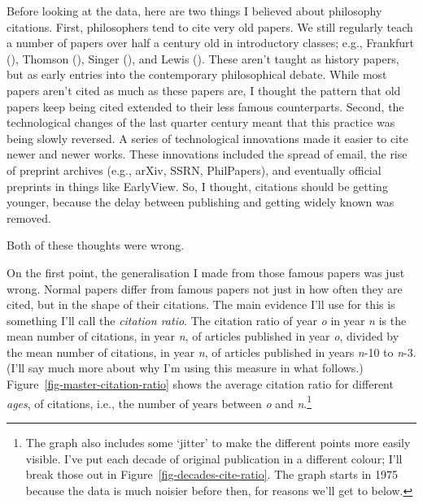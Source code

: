 \documentclass[
  12pt,
  letterpaper,
  DIV=11,
  numbers=noendperiod]{scrartcl}
\begin{document}
Before looking at the data, here are two things I believed about
philosophy citations. First, philosophers tend to cite very old papers.
We still regularly teach a number of papers over half a century old in
introductory classes; e.g., Frankfurt
(), Thomson
(), Singer
(), and Lewis
(). These aren't taught as history
papers, but as early entries into the contemporary philosophical debate.
While most papers aren't cited as much as these papers are, I thought
the pattern that old papers keep being cited extended to their less
famous counterparts. Second, the technological changes of the last
quarter century meant that this practice was being slowly reversed. A
series of technological innovations made it easier to cite newer and
newer works. These innovations included the spread of email, the rise of
preprint archives (e.g., arXiv, SSRN, PhilPapers), and eventually
official preprints in things like EarlyView. So, I thought, citations
should be getting younger, because the delay between publishing and
getting widely known was removed.

Both of these thoughts were wrong.

On the first point, the generalisation I made from those famous papers
was just wrong. Normal papers differ from famous papers not just in how
often they are cited, but in the shape of their citations. The main
evidence I'll use for this is something I'll call the \emph{citation
ratio}. The citation ratio of year \emph{o} in year \emph{n} is the mean
number of citations, in year \emph{n}, of articles published in year
\emph{o}, divided by the mean number of citations, in year \emph{n}, of
articles published in years \emph{n}-10 to \emph{n}-3. (I'll say much
more about why I'm using this measure in what follows.)
Figure~\ref{fig-master-citation-ratio} shows the average citation ratio
for different \emph{ages}, of citations, i.e., the number of years
between \emph{o} and \emph{n}.\footnote{The graph also includes some
  `jitter' to make the different points more easily visible. I've put
  each decade of original publication in a different colour; I'll break
  those out in Figure~\ref{fig-decades-cite-ratio}. The graph starts in
  1975 because the data is much noisier before then, for reasons we'll
  get to below.}
\end{document}
